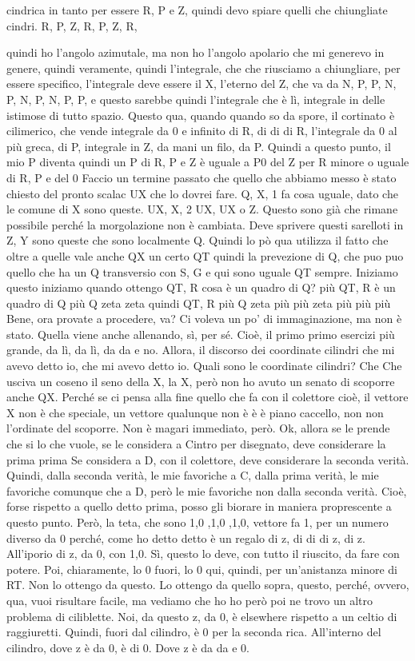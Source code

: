 \begin{soluzione}
cindrica in tanto per essere R, P e Z, quindi devo spiare quelli che chiungliate cindri. R, P, Z, R, P, Z, R, 
   
   quindi ho l'angolo azimutale, ma non ho l'angolo apolario che mi generevo in genere, quindi veramente, quindi l'integrale, che che riusciamo a chiungliare, per essere specifico, l'integrale deve essere il X, l'eterno del Z, che va da N, P, P, N, P, N, P, N, P, P, e questo sarebbe quindi l'integrale che è lì, integrale in delle istimose di tutto spazio. Questo qua, quando quando so da spore, il cortinato è cilimerico, che vende integrale da 0 e infinito di R, di di di R, l'integrale da 0 al più greca, di P, integrale in Z, da mani un filo, da P. Quindi a questo punto, il mio P diventa quindi un P di R, P e Z è uguale a P0 del Z per R minore o uguale di R, P e del 0 Faccio un termine passato che quello che abbiamo messo è stato chiesto del pronto scalac UX che lo dovrei fare. Q, X, 1 fa cosa uguale, dato che le comune di X sono queste. UX, X, 2 UX, UX o Z. Questo sono già che rimane possibile perché la morgolazione non è cambiata. Deve sprivere questi sarelloti in Z, Y sono queste che sono localmente Q. Quindi lo pò qua utilizza il fatto che oltre a quelle vale anche QX un certo QT quindi la prevezione di Q, che puo puo quello che ha un Q transversio con S, G e qui sono uguale QT sempre. Iniziamo questo iniziamo quando ottengo QT, R cosa è un quadro di Q? più QT, R è un quadro di Q più Q zeta zeta quindi QT, R più Q zeta più più zeta più più più Bene, ora provate a procedere, va? Ci voleva un po' di immaginazione, ma non è stato. Quella viene anche allenando, sì, per sé. Cioè, il primo primo esercizi più grande, da lì, da lì, da da e no. Allora, il discorso dei coordinate cilindri che mi avevo detto io, che mi avevo detto io. Quali sono le coordinate cilindri? Che Che usciva un coseno il seno della X, la X, però non ho avuto un senato di scoporre anche QX. Perché se ci pensa alla fine quello che fa con il colettore cioè, il vettore X non è che speciale, un vettore qualunque non è è è piano caccello, non non l'ordinate del scoporre. Non è magari immediato, però. Ok, allora se le prende che si lo che vuole, se le considera a Cintro per disegnato, deve considerare la prima prima Se considera a D, con il colettore, deve considerare la seconda verità. Quindi, dalla seconda verità, le mie favoriche a C, dalla prima verità, le mie favoriche comunque che a D, però le mie favoriche non dalla seconda verità. Cioè, forse rispetto a quello detto prima, posso gli biorare in maniera proprescente a questo punto. Però, la teta, che sono 1,0 ,1,0 ,1,0, vettore fa 1, per un numero diverso da 0 perché, come ho detto detto è un regalo di z, di di di z, di z. All'iporio di z, da 0, con 1,0. Sì, questo lo deve, con tutto il riuscito, da fare con potere. Poi, chiaramente, lo 0 fuori, lo 0 qui, quindi, per un'anistanza minore di RT. Non lo ottengo da questo. Lo ottengo da quello sopra, questo, perché, ovvero, qua, vuoi risultare facile, ma vediamo che ho ho però poi ne trovo un altro problema di ciliblette. Noi, da questo z, da 0, è elsewhere rispetto a un celtio di raggiuretti. Quindi, fuori dal cilindro, è 0 per la seconda rica. All'interno del cilindro, dove z è da 0, è di 0. Dove z è da da e 0. 
\end{soluzione}
